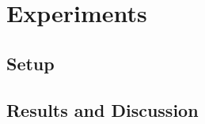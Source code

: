 \documentclass[a4paper]{article}
\begin{document}
\section{Experiments}
\subsection{Setup}
\subsection{Results and Discussion}

 

\end{document}
